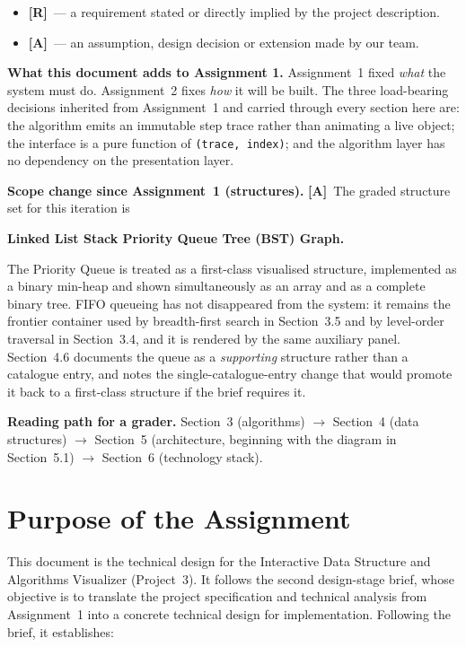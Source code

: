 \documentclass[11pt,a4paper]{article}
\newcommand{\R}{\textcolor{reqc}{\textbf{[R]}}}     %
\newcommand{\A}{\textcolor{asmc}{\textbf{[A]}}}     %
\newcommand{\ct}[1]{\texttt{#1}}
\begin{document}
\begin{itemize}[leftmargin=1.5em,topsep=2pt,itemsep=1pt]
  \item \R\ --- a requirement stated or directly implied by the project description.
  \item \A\ --- an assumption, design decision or extension made by our team.
\end{itemize}

\noindent\textbf{What this document adds to Assignment 1.} Assignment~1 fixed \emph{what}
the system must do. Assignment~2 fixes \emph{how} it will be built. The three load-bearing
decisions inherited from Assignment~1 and carried through every section here are: the
algorithm emits an immutable step trace rather than animating a live object; the interface
is a pure function of \ct{(trace, index)}; and the algorithm layer has no dependency on the
presentation layer.

\medskip
\noindent\textbf{Scope change since Assignment~1 (structures).} \A\ The graded structure set for
this iteration is

\begin{center}
\textbf{Linked List \quad Stack \quad Priority Queue \quad Tree (BST) \quad Graph.}
\end{center}

\noindent The Priority Queue is treated as a first-class visualised structure, implemented as a
binary min-heap and shown simultaneously as an array and as a complete binary tree. FIFO
queueing has not disappeared from the system: it remains the frontier container used by
breadth-first search in Section~3.5 and by level-order traversal in Section~3.4, and it is
rendered by the same auxiliary panel. Section~4.6 documents the queue as a \emph{supporting}
structure rather than a catalogue entry, and notes the single-catalogue-entry change that
would promote it back to a first-class structure if the brief requires it.

\medskip
\noindent\textbf{Reading path for a grader.} Section~3 (algorithms) $\to$ Section~4 (data
structures) $\to$ Section~5 (architecture, beginning with the diagram in Section~5.1) $\to$
Section~6 (technology stack).

\section{Purpose of the Assignment}

This document is the technical design for the Interactive Data Structure and Algorithms
Visualizer (Project~3). It follows the second design-stage brief, whose objective is to
translate the project specification and technical analysis from Assignment~1 into a concrete
technical design for implementation. Following the brief, it establishes:
\end{document}
